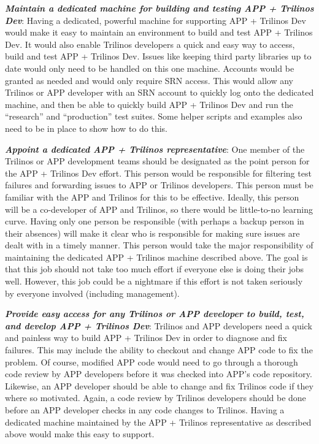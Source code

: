 \documentclass[pdf,ps2pdf,11pt]{SANDreport}
\begin{document}
{}\textit{\textbf{Maintain a dedicated machine for building and testing APP +
Trilinos Dev}}: Having a dedicated, powerful machine for supporting APP +
Trilinos Dev would make it easy to maintain an environment to build and test
APP + Trilinos Dev.  It would also enable Trilinos developers a quick and easy
way to access, build and test APP + Trilinos Dev.  Issues like keeping third
party libraries up to date would only need to be handled on this one machine.
Accounts would be granted as needed and would only require SRN access.  This
would allow any Trilinos or APP developer with an SRN account to quickly log
onto the dedicated machine, and then be able to quickly build APP + Trilinos
Dev and run the ``research'' and ``production'' test suites.  Some helper
scripts and examples also need to be in place to show how to do this.

{}\textit{\textbf{Appoint a dedicated APP + Trilinos representative}}: One member
of the Trilinos or APP development teams should be designated as the point
person for the APP + Trilinos Dev effort.  This person would be responsible
for filtering test failures and forwarding issues to APP or Trilinos
developers.  This person must be familiar with the APP and Trilinos for this
to be effective.  Ideally, this person will be a co-developer of APP and
Trilinos, so there would be little-to-no learning curve.  Having only one
person be responsible (with perhaps a backup person in their absences) will
make it clear who is responsible for making sure issues are dealt with in a
timely manner.  This person would take the major responsibility of maintaining
the dedicated APP + Trilinos machine described above. The goal is that this
job should not take too much effort if everyone else is doing their jobs well.
However, this job could be a nightmare if this effort is not taken seriously
by everyone involved (including management).

{}\textit{\textbf{Provide easy access for any Trilinos or APP developer to build,
test, and develop APP + Trilinos Dev}}: Trilinos and APP developers need a
quick and painless way to build APP + Trilinos Dev in order to diagnose and
fix failures.  This may include the ability to checkout and change APP code to
fix the problem.  Of course, modified APP code would need to go through a
thorough code review by APP developers before it was checked into APP's code
repository.  Likewise, an APP developer should be able to change and fix
Trilinos code if they where so motivated.  Again, a code review by Trilinos
developers should be done before an APP developer checks in any code changes
to Trilinos.  Having a dedicated machine maintained by the APP + Trilinos
representative as described above would make this easy to support.
\end{document}
